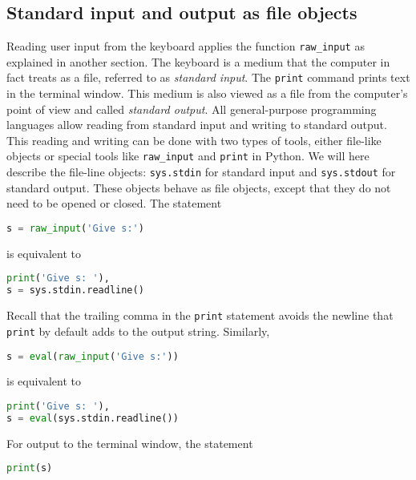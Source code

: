\documentclass[graybox,sectrefs,envcountresetchap,open=right,final]{svmonodo}
\begin{document}
\subsection{Standard input and output as file objects}
 
Reading user input from the keyboard applies the function
\Verb!raw_input! as explained in another section.
The keyboard is a medium that the computer in fact
treats as a file, referred to
as \emph{standard input}.
The \texttt{print} command prints text in the terminal window. This medium
is also viewed as a file from the computer's point of view and called
\emph{standard output}. All general-purpose programming languages
allow reading from standard input and
writing to standard output. This reading and writing can be done with
two types of tools, either file-like objects or special tools like
\Verb!raw_input!
and \texttt{print} in Python.
We will here describe the file-line objects:
\texttt{sys.stdin} for standard input
and \texttt{sys.stdout} for standard output. These objects
behave as file objects, except that they do not need to be opened or
closed. The statement
\begin{lstlisting}[language=Python,style=simple,xleftmargin=2mm]
s = raw_input('Give s:')

\end{lstlisting}

is equivalent to
\begin{lstlisting}[language=Python,style=simple,xleftmargin=2mm]
print('Give s: '),
s = sys.stdin.readline()

\end{lstlisting}

Recall that the trailing comma in the \texttt{print} statement avoids the
newline that \texttt{print} by default adds to the output string.
Similarly,
\begin{lstlisting}[language=Python,style=simple,xleftmargin=2mm]
s = eval(raw_input('Give s:'))

\end{lstlisting}

is equivalent to
\begin{lstlisting}[language=Python,style=simple,xleftmargin=2mm]
print('Give s: '),
s = eval(sys.stdin.readline())

\end{lstlisting}

For output to the terminal window, the statement
\begin{lstlisting}[language=Python,style=simple,xleftmargin=2mm]
print(s)

\end{lstlisting}
\end{document}
